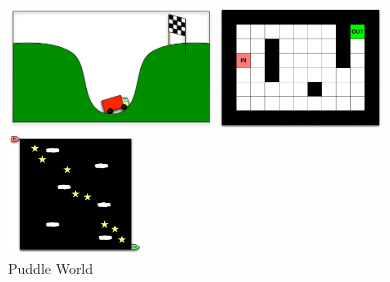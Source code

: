 \begin{figure}[ht!]
\begin{minipage}[t]{0.31\linewidth}
\center
\includegraphics[height=3.2cm]{MC_problem.pdf}
\caption{Mountain Car
}\label{fig:MC:problem}
\end{minipage}
\hspace{0.1mm}
\begin{minipage}[t]{0.25\linewidth}
\center
\includegraphics[height=3.2cm]{MZ_problem.pdf}
\caption{Maze
}\label{fig:MZ:problem}
\end{minipage}
\hspace{0.1mm}
\begin{minipage}[t]{0.22\linewidth}
\center
\includegraphics[height=3.2cm]{PW_problem.pdf}
\caption{Puddle World
}\label{fig:PW:problem}
\end{minipage}
\hspace{0.1mm}
\begin{minipage}[t]{0.19\linewidth}

\end{minipage}
\end{figure}
